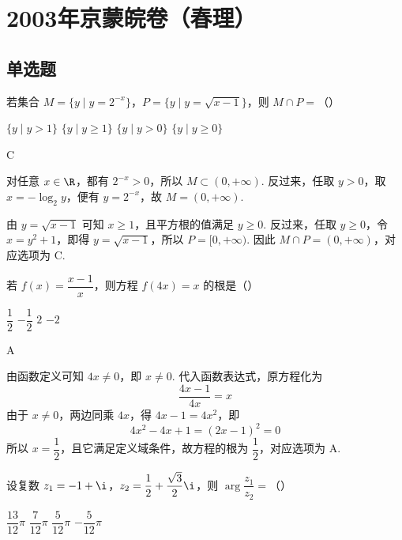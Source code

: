 \chapter{2003年京蒙皖卷（春理）}
\section{单选题}
\begin{problem}
若集合 \(M=\{y\mid y=2^{-x}\}\)，\(P=\{y\mid y=\sqrt{x-1}\}\)，则 \(M\cap P=\)（\quad）

\choices
    {\(\{y\mid y>1\}\)}
    {\(\{y\mid y\geqslant1\}\)}
    {\(\{y\mid y>0\}\)}
    {\(\{y\mid y\geqslant0\}\)}
\end{problem}

\begin{answer}
C
\end{answer}

\begin{solution}
对任意 \(x\in\R\)，都有 \(2^{-x}>0\)，所以 \(M\subset(0,+\infty)\). 反过来，任取 \(y>0\)，取 \(x=-\log_{2}y\)，便有 \(y=2^{-x}\)，故 \(M=(0,+\infty)\).

由 \(y=\sqrt{x-1}\) 可知 \(x\geqslant1\)，且平方根的值满足 \(y\geqslant0\). 反过来，任取 \(y\geqslant0\)，令 \(x=y^{2}+1\)，即得 \(y=\sqrt{x-1}\)，所以 \(P=[0,+\infty)\). 因此 \(M\cap P=(0,+\infty)\)，对应选项为 C.
\end{solution}

\begin{problem}
若 \(f(x)=\dfrac{x-1}{x}\)，则方程 \(f(4x)=x\) 的根是（\quad）

\choices
    {\(\dfrac12\)}
    {\(-\dfrac12\)}
    {\(2\)}
    {\(-2\)}
\end{problem}

\begin{answer}
A
\end{answer}

\begin{solution}
由函数定义可知 \(4x\ne0\)，即 \(x\ne0\). 代入函数表达式，原方程化为
\[
\dfrac{4x-1}{4x}=x
\]
由于 \(x\ne0\)，两边同乘 \(4x\)，得 \(4x-1=4x^{2}\)，即
\[
4x^{2}-4x+1=(2x-1)^{2}=0
\]
所以 \(x=\dfrac12\)，且它满足定义域条件，故方程的根为 \(\dfrac12\)，对应选项为 A.
\end{solution}

\begin{problem}
设复数 \(z_{1}=-1+\i\)，\(z_{2}=\dfrac12+\dfrac{\sqrt3}{2}\i\)，则 \(\arg\dfrac{z_{1}}{z_{2}}=\)（\quad）

\choices
    {\(\dfrac{13}{12}\pi\)}
    {\(\dfrac{7}{12}\pi\)}
    {\(\dfrac{5}{12}\pi\)}
    {\(-\dfrac{5}{12}\pi\)}
\end{problem}

